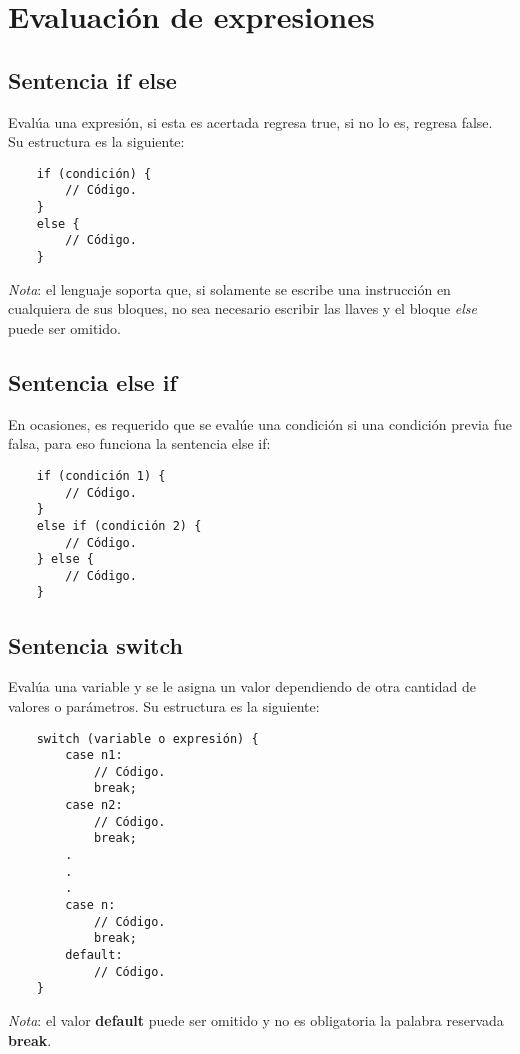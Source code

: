 \section{Evaluación de expresiones}


\subsection{Sentencia if else}
Evalúa una expresión, si esta es acertada regresa true, si no lo es, regresa false. Su estructura es la siguiente:
\begin{lstlisting}
    if (condición) {
        // Código.
    }
    else {
        // Código.
    }
\end{lstlisting}

\textit{Nota}: el lenguaje soporta que, si solamente se escribe una instrucción en cualquiera de sus bloques, no sea necesario escribir las llaves y el bloque \textit{else} puede ser omitido.


\subsection{Sentencia else if}

En ocasiones, es requerido que se evalúe una condición si una condición previa fue falsa, para eso funciona la sentencia else if:
\begin{lstlisting}
    if (condición 1) {
        // Código.
    }
    else if (condición 2) {
        // Código.
    } else {
        // Código.
    }
\end{lstlisting}


\subsection{Sentencia switch}

Evalúa una variable y se le asigna un valor dependiendo de otra cantidad de valores o parámetros. Su estructura es la siguiente:
\begin{lstlisting}
    switch (variable o expresión) {
        case n1:
            // Código.
            break;
        case n2:
            // Código.
            break;
        .
        .
        .
        case n:
            // Código.
            break;
        default:
            // Código.
    }
\end{lstlisting}

\textit{Nota}: el valor \textbf{default} puede ser omitido y no es obligatoria la palabra reservada \textbf{break}.



